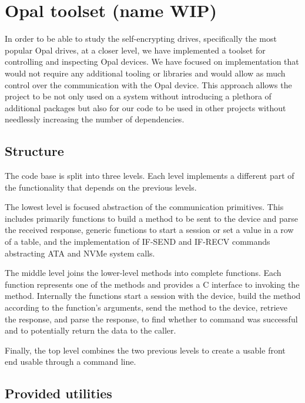 \chapter{Opal toolset (name WIP)}


In order to be able to study the self-encrypting drives, specifically the most popular Opal drives, at a closer level, we have implemented a toolset for controlling and inspecting Opal devices. 
We have focused on implementation that would not require any additional tooling or libraries and would allow as much control over the communication with the Opal device. This approach allows the project to be not only used on a system without introducing a plethora of additional packages but also for our code to be used in other projects without needlessly increasing the number of dependencies.

\section{Structure}

The code base is split into three levels. Each level implements a different part of the functionality that depends on the previous levels.

The lowest level is focused abstraction of the communication primitives. This includes primarily functions to build a method to be sent to the device and parse the received response, generic functions to start a session or set a value in a row of a table, and the implementation of IF-SEND and IF-RECV commands abstracting ATA and NVMe system calls.


The middle level joins the lower-level methods into complete functions. Each function represents one of the methods and provides a C interface to invoking the method. Internally the functions start a session with the device, build the method according to the function's arguments, send the method to the device, retrieve the response, and parse the response, to find whether to command was successful and to potentially return the data to the caller.

Finally, the top level combines the two previous levels to create a usable front end usable through a command line.

\section{Provided utilities}


